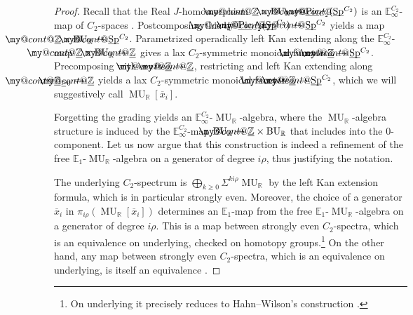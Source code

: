 \documentclass[a4paper, 10pt]{article}
\makeatletter
\newcommand{\E}{\mathbb E}  %
\newcommand{\R}{\mathbb R}
\newcommand{\Z}{\mathbb{Z}}
\newcommand{\MU}{\operatorname{MU}}
\newcommand{\MUR}{{\MU_{\mathbb{R}}}}
\newcommand{\Sp}{\mathrm{Sp}}
\newcommand{\BU}{\operatorname{BU}}
\newcommand{\BUR}{{\BU_{\mathbb{R}}}}
\newcommand{\Pic}{\operatorname{Pic}}
\DeclareRobustCommand{\myuline}[2][0pt]{%
  \ifmmode
    \uline{\hphantom{#2}\kern-#1}%
    \kern#1%
    \mathllap{\mathpalette\my@cont@{#2}}%
  \else
    \uline{\phantom{#2}\kern-#1}%
    \kern#1%
    \llap{\contour{white}{#2}}%
  \fi
}
\newcommand{\ul}{\myuline}
\newcommand{\ol}{\overline}
\newcommand{\my@cont@}[2]{\contour{white}{\mbox{$\m@th#1#2$}}}
\theoremstyle{definition}
\makeatother
\begin{document}
\begin{proof}
Recall that the Real \(J\)-homomorphism \(\ul{\Z}\times\BUR \to \ul{\Pic}_{C_2}(\ul{\Sp}^{C_2})\) is an \(\E^{C_2}_\infty\)-map of $C_2$-spaces \cite[Appendix A.2]{quinnZhu2026multiplicativeequivariantthomspectra}. Postcomposing this by $\ul{\Pic}_{C_2}(\ul{\Sp}^{C_2}) \to \ul{\Sp}^{C_2}$ yields a map $\ul{\Z} \times \BUR \to \ul{\Sp}^{C_2}$. Parametrized operadically left Kan extending \cite{nardinshah2022equivarianttopos} along the $\E_{\infty}^{C_2}$-map \( \ul{\Z}\times\BUR \to \ul{\Z}\) gives a lax \(C_2\)-symmetric monoidal functor \(\ul{\Z}\to \ul{\Sp}^{C_2}\).
    Precomposing with \(-\cdot i \colon \ul{\Z} \to \ul{\Z}\),
    restricting and left Kan extending along \(\ul{\Z}_{\geq 0}\hookrightarrow \ul{\Z}\) yields a lax $C_2$-symmetric monoidal functor $\ul{\Z} \to \ul{\Sp}^{C_2}$, which we will suggestively call $\MUR[\ol{x}_i]$.
    \begin{center}
    \end{center}
    Forgetting the grading yields an \(\E^{C_2}_\infty\)-\(\MUR\)-algebra, where the $\MUR$-algebra structure is induced by the $\E_\infty^{C_2}$-map $\BUR \to \ul{\Z} \times \BUR$ that includes into the $0$-component. Let us now argue that this construction is indeed a refinement of the free $\E_1$-$\MUR$-algebra on a generator of degree $i\rho$, thus justifying the notation. 
    
    The underlying $C_2$-spectrum is $\bigoplus_{k \geq 0} \Sigma^{ki\rho} \MUR$ by the left Kan extension formula, which is in particular strongly even. Moreover, the choice of a generator $\ol{x}_i$ in $\pi_{i\rho}(\MUR[\ol{x}_i])$ determines an $\E_1$-map from the free $\E_1$-$\MUR$-algebra on a generator of degree $i\rho$. This is a map between strongly even $C_2$-spectra, which is an equivalence on underlying, checked on homotopy groups.\footnote{On underlying it precisely reduces to Hahn--Wilson's construction \cite[Construction 2.6.1]{hahnWilson2022redshift}.} On the other hand, any map between strongly even $C_2$-spectra, which is an equivalence on underlying, is itself an equivalence \cite[Lemma 3.4]{hillmeier2017}.
\end{proof}
\end{document}
